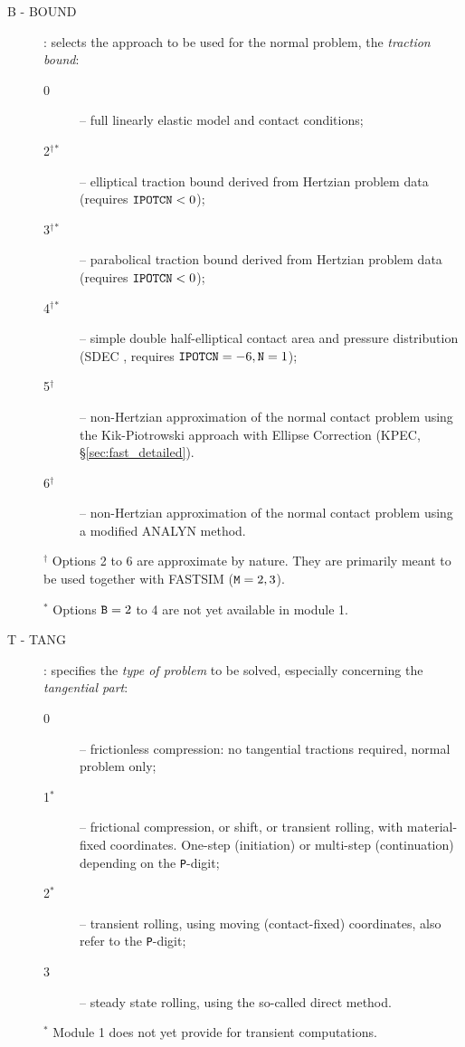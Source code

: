 \documentclass[12pt]{report}
\renewcommand{\magenta}[1]{}
\begin{document}
\begin{description}
\item[B - BOUND]  \label{b-digit}  : selects the approach to be
        used for the normal problem, the {\em traction bound\/}:
\begin{description}
\item[0] -- full linearly elastic model and contact conditions;
\magenta{
\item[1] -- full linearly elastic model, extended with a thin, compressible
        elastic layer, with full contact conditions (\S \ref{sec:thin_sheet});
}
\item[2$^\dagger$$^*$] -- elliptical traction bound derived from Hertzian
        problem data (requires ${\tt IPOTCN}<0$);
\item[3$^\dagger$$^*$] -- parabolical traction bound derived from Hertzian
        problem data (requires ${\tt IPOTCN}<0$);
\item[4$^\dagger$$^*$] -- simple double half-elliptical contact area and
        pressure distribution (SDEC \cite{Piotrowski2017}, requires
        ${\tt IPOTCN}=-6, {\tt N}=1$);
\item[5$^\dagger$] -- non-Hertzian approximation of the normal contact problem
        using the Kik-Piotrowski approach with Ellipse Correction (KPEC,
        \S \ref{sec:fast_detailed}).
\item[6$^\dagger$] -- non-Hertzian approximation of the normal contact problem
        using a modified ANALYN method.
\end{description}
$^\dagger$ Options 2 to 6 are approximate by nature. They are primarily meant
to be used together with FASTSIM (${\tt M}=2, 3$).

$^*$ Options ${\tt B}=2$ to 4 are not yet available in module 1.

\item[T - TANG]  \label{t-digit}  : specifies the {\em type of problem\/}
        to be solved, especially concerning the {\em tangential part\/}:
\begin{description}
\item[0] -- frictionless compression: no tangential tractions
        required, normal problem only;
\item[1$^*$] -- frictional compression, or shift, or transient rolling, with
        material-fixed coordinates. One-step (initiation) or multi-step
        (continuation) depending on the {\tt P}-digit;
\item[2$^*$] -- transient rolling, using moving (contact-fixed) coordinates,
        also refer to the {\tt P}-digit;
\item[3] -- steady state rolling, using the so-called direct method.
\end{description}
$^*$ Module 1 does not yet provide for transient computations.


\end{description}
\end{document}
